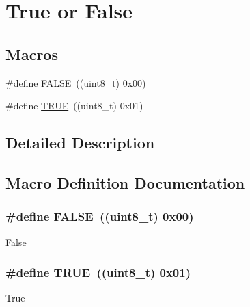 \hypertarget{group___true___false}{}\section{True or False}
\label{group___true___false}
\subsection*{Macros}
\begin{DoxyCompactItemize}
\item 
\#define \hyperlink{group___true___false_gaa93f0eb578d23995850d61f7d61c55c1}{F\+A\+L\+SE}~((uint8\+\_\+t) 0x00)
\item 
\#define \hyperlink{group___true___false_gaa8cecfc5c5c054d2875c03e77b7be15d}{T\+R\+UE}~((uint8\+\_\+t) 0x01)
\end{DoxyCompactItemize}


\subsection{Detailed Description}


\subsection{Macro Definition Documentation}
\subsubsection[{\texorpdfstring{F\+A\+L\+SE}{FALSE}}]{\setlength{\rightskip}{0pt plus 5cm}\#define F\+A\+L\+SE~((uint8\+\_\+t) 0x00)}\hypertarget{group___true___false_gaa93f0eb578d23995850d61f7d61c55c1}{}\label{group___true___false_gaa93f0eb578d23995850d61f7d61c55c1}
False 
\subsubsection[{\texorpdfstring{T\+R\+UE}{TRUE}}]{\setlength{\rightskip}{0pt plus 5cm}\#define T\+R\+UE~((uint8\+\_\+t) 0x01)}\hypertarget{group___true___false_gaa8cecfc5c5c054d2875c03e77b7be15d}{}\label{group___true___false_gaa8cecfc5c5c054d2875c03e77b7be15d}
True 